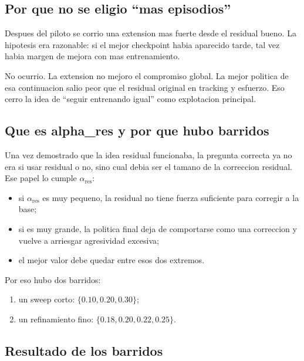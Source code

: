 \documentclass[11pt,a4paper]{article}
\begin{document}
\subsection{Por que no se eligio ``mas episodios''}

Despues del piloto se corrio una extension mas fuerte desde el residual bueno. La hipotesis era razonable: si el mejor checkpoint habia aparecido tarde, tal vez habia margen de mejora con mas entrenamiento.

No ocurrio. La extension no mejoro el compromiso global. La mejor politica de esa continuacion salio peor que el residual original en tracking y esfuerzo. Eso cerro la idea de ``seguir entrenando igual'' como explotacion principal.

\subsection{Que es alpha\_res y por que hubo barridos}

Una vez demostrado que la idea residual funcionaba, la pregunta correcta ya no era si usar residual o no, sino cual debia ser el tamano de la correccion residual. Ese papel lo cumple \(\alpha_{\mathrm{res}}\):
\begin{itemize}[leftmargin=1.5em]
\item si \(\alpha_{\mathrm{res}}\) es muy pequeno, la residual no tiene fuerza suficiente para corregir a la base;
\item si es muy grande, la politica final deja de comportarse como una correccion y vuelve a arriesgar agresividad excesiva;
\item el mejor valor debe quedar entre esos dos extremos.
\end{itemize}

Por eso hubo dos barridos:
\begin{enumerate}[leftmargin=1.5em]
\item un sweep corto: \(\{0.10, 0.20, 0.30\}\);
\item un refinamiento fino: \(\{0.18, 0.20, 0.22, 0.25\}\).
\end{enumerate}

\subsection{Resultado de los barridos}
\end{document}
